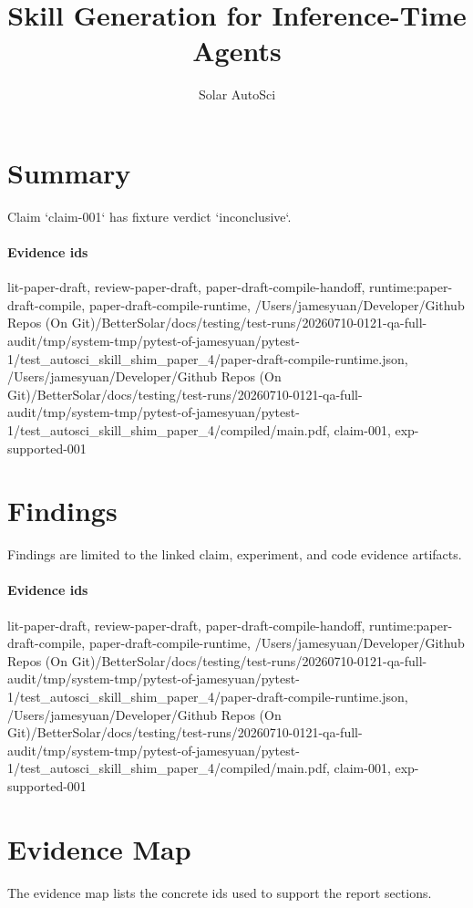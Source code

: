 \documentclass{article}
\title{Skill Generation for Inference-Time Agents}
\author{Solar AutoSci}
\date{}
\begin{document}
\maketitle

\section{Summary}
Claim `claim-001` has fixture verdict `inconclusive`.

\paragraph{Evidence ids} lit-paper-draft, review-paper-draft, paper-draft-compile-handoff, runtime:paper-draft-compile, paper-draft-compile-runtime, /Users/jamesyuan/Developer/Github Repos (On Git)/BetterSolar/docs/testing/test-runs/20260710-0121-qa-full-audit/tmp/system-tmp/pytest-of-jamesyuan/pytest-1/test\_autosci\_skill\_shim\_paper\_4/paper-draft-compile-runtime.json, /Users/jamesyuan/Developer/Github Repos (On Git)/BetterSolar/docs/testing/test-runs/20260710-0121-qa-full-audit/tmp/system-tmp/pytest-of-jamesyuan/pytest-1/test\_autosci\_skill\_shim\_paper\_4/compiled/main.pdf, claim-001, exp-supported-001

\section{Findings}
Findings are limited to the linked claim, experiment, and code evidence artifacts.

\paragraph{Evidence ids} lit-paper-draft, review-paper-draft, paper-draft-compile-handoff, runtime:paper-draft-compile, paper-draft-compile-runtime, /Users/jamesyuan/Developer/Github Repos (On Git)/BetterSolar/docs/testing/test-runs/20260710-0121-qa-full-audit/tmp/system-tmp/pytest-of-jamesyuan/pytest-1/test\_autosci\_skill\_shim\_paper\_4/paper-draft-compile-runtime.json, /Users/jamesyuan/Developer/Github Repos (On Git)/BetterSolar/docs/testing/test-runs/20260710-0121-qa-full-audit/tmp/system-tmp/pytest-of-jamesyuan/pytest-1/test\_autosci\_skill\_shim\_paper\_4/compiled/main.pdf, claim-001, exp-supported-001

\section{Evidence Map}
The evidence map lists the concrete ids used to support the report sections.
\end{document}
